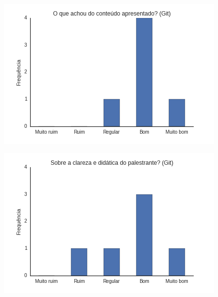 \documentclass[12pt]{article}
\begin{document}
\begin{center}
    \includegraphics[height=0.25\textheight]{images/git2.png}
\end{center}

\begin{center}
    \includegraphics[height=0.25\textheight]{images/git3.png}
\end{center}
\end{document}
